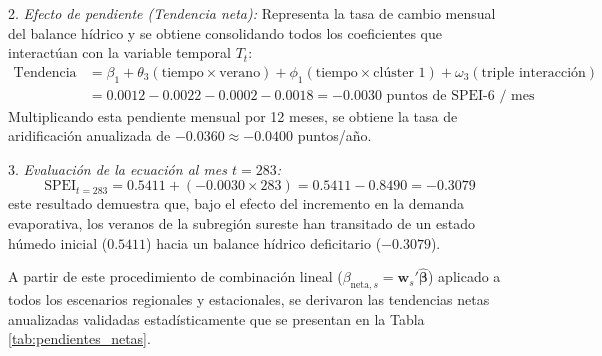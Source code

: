 \documentclass[11pt,a4paper]{article}
\begin{document}
2. \textit{Efecto de pendiente (Tendencia neta):} Representa la tasa de cambio mensual del balance hídrico y se obtiene consolidando todos los coeficientes que interactúan con la variable temporal $T_t$:
\begin{equation}
\begin{split}
\text{Tendencia neta} &= \beta_1 + \theta_3(\text{tiempo} \times \text{verano}) + \phi_1(\text{tiempo} \times \text{clúster 1}) + \omega_3(\text{triple interacción}) \\
&= 0.0012 - 0.0022 - 0.0002 - 0.0018 = \mathbf{-0.0030} \text{ puntos de SPEI-6 / mes}
\end{split}
\end{equation}
Multiplicando esta pendiente mensual por 12 meses, se obtiene la tasa de aridificación anualizada de $\mathbf{-0.0360} \approx \mathbf{-0.0400}$ puntos/año.

3. \textit{Evaluación de la ecuación al mes $t = 283$:}
\begin{equation}
\text{SPEI}_{t=283} = 0.5411 + (-0.0030 \times 283) = 0.5411 - 0.8490 = \mathbf{-0.3079}
\end{equation}
este resultado demuestra que, bajo el efecto del incremento en la demanda evaporativa, los veranos de la subregión sureste han transitado de un estado húmedo inicial ($0.5411$) hacia un balance hídrico deficitario ($-0.3079$).

A partir de este procedimiento de combinación lineal ($\beta_{\text{neta},s} = \mathbf{w}_s' \boldsymbol{\hat{\beta}}$) aplicado a todos los escenarios regionales y estacionales, se derivaron las tendencias netas anualizadas validadas estadísticamente que se presentan en la Tabla \ref{tab:pendientes_netas}.
\end{document}
